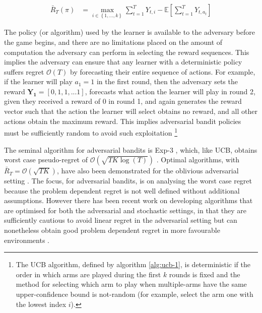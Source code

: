 \documentclass[11pt,a4paper,oneside]{book}
\newcommand{\E}[1]{\mathbb E\left[{#1}\right]}
\newcommand{\set}[1]{\left\{#1\right\}}
\newcommand{\eqn}[1]{\begin{align}#1\end{align}}
\newcommand{\bigo}[1]{\mathcal{O}\left( #1 \right)}
\renewcommand{\vec}[1]{\boldsymbol{#1}}
\newcommand{\regret}{\bar{R}_{T}} %
\theoremstyle{plain}
\theoremstyle{definition}
\begin{document}
\eqn{
\label{eqn:pseudo_regret-adversarial}
\regret(\pi) &= \max_{i \in \set{1,...,k}}{\sum_{t=1}^T{Y_{t,i}}} - \E{\sum_{t=1}^T{Y_{t,a_t}}}
}

The policy (or algorithm) used by the learner is available to the adversary before the game begins, and there are no limitations placed on the amount of computation the adversary can perform in selecting the reward sequences. This implies the adversary can ensure that any learner with a deterministic policy suffers regret $\bigo{T}$ by forecasting their entire sequence of actions. For example, if the learner will play $a_1 = 1$ in the first round, then the adversary sets the reward $\vec{Y_1} = [0,1,1,...1]$, forecasts what action the learner will play in round 2, given they received a reward of 0 in round 1, and again generates the reward vector such that the action the learner will select obtains no reward, and all other actions obtain the maximum reward. This implies adversarial bandit policies must be sufficiently random to avoid such exploitation \footnote{The UCB algorithm, defined by algorithm \ref{alg:ucb-1}, is deterministic if the order in which arms are played during the first $k$ rounds is fixed and the method for selecting which arm to play when multiple-arms have the same upper-confidence bound is not-random (for example, select the arm one with the lowest index $i$).}

The seminal algorithm for adversarial bandits is Exp-3 \citep{Auer2002}, which, like UCB, obtains worst case pseudo-regret of $\bigo{\sqrt{TK\log(T)}}$  \citep{Auer1995}. Optimal algorithms, with $\regret = \bigo{\sqrt{TK}}$, have also been demonstrated for the oblivious adversarial setting \citep{Audibert2009}. The focus, for adversarial bandits, is on analysing the worst case regret because the problem dependent regret is not well defined without additional assumptions. However there has been recent work on developing algorithms that are optimised for both the adversarial and stochastic settings, in that they are sufficiently cautious to avoid linear regret in the adversarial setting but can nonetheless obtain good problem dependent regret in more favourable environments \citep{bubeck2012bothworlds,Auer2016}. 
\end{document}
